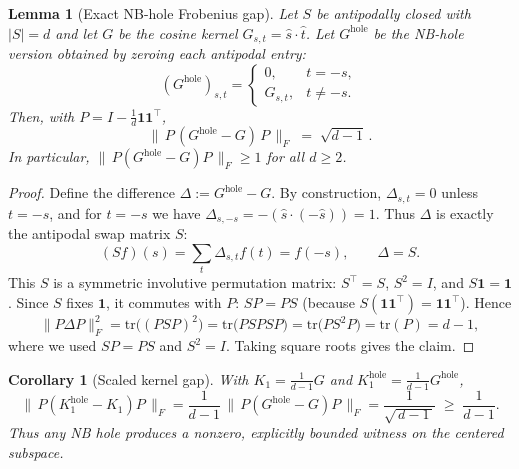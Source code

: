 \documentclass[11pt]{article}
\newtheorem{lemma}[theorem]{Lemma}
\newtheorem{corollary}[theorem]{Corollary}
\theoremstyle{definition}
\newcommand{\1}{\mathbf{1}}
\newcommand{\tr}{\mathrm{tr}}
\begin{document}
\begin{lemma}[Exact NB-hole Frobenius gap]\label{lem:NBhole-gap}
Let $S$ be antipodally closed with $|S|=d$ and let $G$ be the cosine kernel $G_{s,t}=\hat s\!\cdot\!\hat t$.
Let $G^{\mathrm{hole}}$ be the NB-hole version obtained by zeroing each antipodal entry:
\[
(G^{\mathrm{hole}})_{s,t}=\begin{cases}
0,& t=-s,\\
G_{s,t},& t\neq -s.
\end{cases}
\]
Then, with $P=I-\frac{1}{d}\1\1^\top$,
\[
\bigl\|\,P\,(G^{\mathrm{hole}}-G)\,P\,\bigr\|_F \;=\; \sqrt{d-1}\,.
\]
In particular, $\bigl\|\,P(G^{\mathrm{hole}}-G)P\,\bigr\|_F \ge 1$ for all $d\ge 2$.
\end{lemma}

\begin{proof}
Define the difference $\Delta:=G^{\mathrm{hole}}-G$. By construction, $\Delta_{s,t}=0$ unless $t=-s$, and for $t=-s$ we have
\(
\Delta_{s,-s}=-(\hat s\!\cdot\!(-\hat s))=1.
\)
Thus $\Delta$ is exactly the antipodal swap matrix $S$:
\[
(\!Sf\!)(s)=\sum_{t}\Delta_{s,t}f(t)=f(-s),\qquad \Delta=S.
\]
This $S$ is a symmetric involutive permutation matrix: $S^\top=S$, $S^2=I$, and $S\1=\1$. Since $S$ fixes $\1$, it commutes with $P$:
\(
SP=PS
\)
(because $S(\1\1^\top)=\1\1^\top$).
Hence
\[
\|P\Delta P\|_F^2=\tr\!\bigl((P S P)^2\bigr)
=\tr\!\bigl(P S P S P\bigr)
=\tr\!\bigl(P S^2 P\bigr)
=\tr(P)=d-1,
\]
where we used $SP=PS$ and $S^2=I$. Taking square roots gives the claim.
\end{proof}

\begin{corollary}[Scaled kernel gap]\label{cor:scaled-gap}
With $K_1=\frac{1}{d-1}G$ and $K_1^{\mathrm{hole}}=\frac{1}{d-1}G^{\mathrm{hole}}$,
\[
\bigl\|\,P(K_1^{\mathrm{hole}}-K_1)P\,\bigr\|_F
=\frac{1}{d-1}\,\bigl\|\,P(G^{\mathrm{hole}}-G)P\,\bigr\|_F
=\frac{1}{\sqrt{\,d-1\,}}
\;\ge\;\frac{1}{d-1}.
\]
Thus any NB hole produces a nonzero, explicitly bounded witness on the centered subspace.
\end{corollary}
\end{document}
